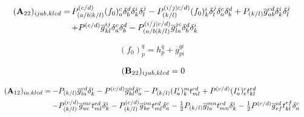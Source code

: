 \begin{subappendices}
\begin{equation}
    \begin{array}{r@{\,}l}
        (\mathbf{A}_{22})_{ijab,klcd}
        =
        &
        P_{(a/b|k/l)}^{(c/d)}
        (f_0)_a^c
        \delta_b^d
        \delta_k^i
        \delta_l^j
        -
        P_{(k/l)}^{(i/j|c/d)}
        (f_0)_k^i
        \delta_l^j
        \delta_a^c
        \delta_b^d
        +
        P_{(k/l)}
        \overline{g}_{ab}^{cd}
        \delta_k^i
        \delta_l^j
        \\[5pt]
        &
        +
        P^{(c/d)}
        \overline{g}_{kl}^{ij}
        \delta_a^c
        \delta_b^d
        -
        P_{(a/b|k/l)}^{(i/j|c/d)}
        \overline{g}_{la}^{jc}
        \delta_b^d
        \delta_k^i
    \end{array}
\end{equation}

\begin{equation}
    (f_0)_p^q
    =
    h_p^q
    +
    \overline{g}_{pi}^{qi}
\end{equation}

\begin{equation}
    \begin{array}{r@{\,}l}
        (\mathbf{B}_{22})_{ijab,klcd}
        =
        0
    \end{array}
\end{equation}

\begin{equation}
    \begin{array}{r@{\,}l}
        (\mathbf{A}_{12})_{ia,klcd}
        =
        &
        -
        P_{(k/l)}
        \overline{g}_{la}^{cd}
        \delta_k^i
        -
        P^{(c/d)}
        \overline{g}_{kl}^{id}
        \delta_a^c
        -
        P_{(k/l)}
        (I_a^i)_k^m
        t_{ml}^{cd}
        +
        P^{(c/d)}
        (I_a^i)_e^c
        t_{kl}^{ed}
        \\[5pt]
        &
        -
        P_{(k/l)}^{(c/d)}
        \overline{g}_{ae}^{mc}
        t_{ml}^{ed}
        \delta_k^i
        -
        P_{(k/l)}^{(c/d)}
        \overline{g}_{ke}^{im}
        t_{ml}^{ed}
        \delta_a^c
        -
        \tfrac{1}{2}
        P_{(k/l)}
        \overline{g}_{la}^{mn}
        t_{mn}^{cd}
        \delta_k^i
        -
        \tfrac{1}{2}
        P^{(c/d)}
        \overline{g}_{ef}^{id}
        t_{kl}^{ef}
        \delta_a^c
    \end{array}
\end{equation}


\end{subappendices}
